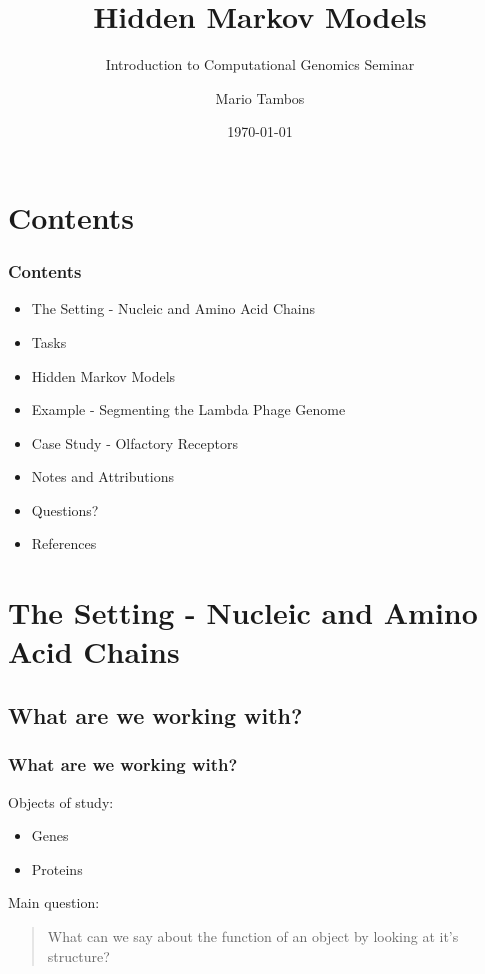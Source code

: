 \documentclass[11pt]{beamer}
\author{Mario Tambos}
\title{Hidden Markov Models}
\subtitle{Introduction to Computational Genomics Seminar}
\institute{M.sc. Computer Science @ TU Berlin}
\date{\today}
\begin{document}
	\maketitle
	\section{Contents}
	\begin{frame}
		\frametitle{Contents}
        \begin{itemize}
            \item The Setting - Nucleic and Amino Acid Chains
            \item Tasks
            \item Hidden Markov Models
            \item Example - Segmenting the Lambda Phage Genome
            \item Case Study - Olfactory Receptors
            \item Notes and Attributions
            \item Questions?
            \item References
        \end{itemize}
	\end{frame}
	\section{The Setting - Nucleic and Amino Acid Chains}
    \subsection{What are we working with?}
    \begin{frame}
        \frametitle{What are we working with?}
        Objects of study:
        \begin{itemize}
            \item Genes
            \item Proteins
        \end{itemize}
        Main question:
        \begin{quote}
            What can we say about the function of an object by looking at it's structure?
        \end{quote}
    \end{frame}
\end{document}
